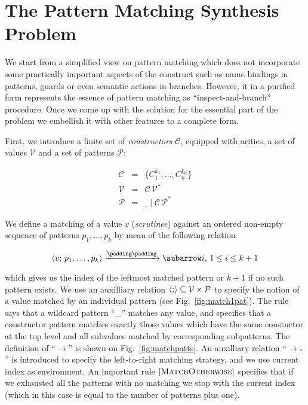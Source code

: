 \section{The Pattern Matching Synthesis Problem}

We start from a simplified view on pattern matching which does not incorporate some practically important aspects of the construct such as
name bindings in patterns, guards or even semantic actions in branches. However, it in a purified form represents the essence of pattern
matching as ``inspect-and-branch'' procedure. Once we come up with the solution for the essential part of the problem we embellish it with
other features to a complete form.

First, we introduce a finite set of \emph{constructors} $\mathcal C$, equipped with arities, a set of values $\mathcal{V}$
and a set of patterns $\mathcal{P}$:
 
\[
 \begin{array}{rcll}
    \mathcal{C} & = & \{ C_1^{k_1}, \dots, C_n^{k_n} \}\\
    \mathcal{V} & = & \mathcal{C}\,\mathcal{V}^*\\  
    \mathcal{P} & = & \_ \mid \mathcal{C}\,\mathcal{P}^*
 \end{array}
\]

We define a matching of a value $v$ (\emph{scrutinee}) against an ordered non-empty sequence of patterns $p_1,\dots,p_k$ by mean of the following
relation

\[
\setarrow{\xrightarrow}
\trans{\inbr{v;\,p_1,\dots,p_k}}{}{i},\,1\le i\le k+1
\]

which gives us the index of the leftmost matched pattern or $k+1$ if no such pattern exists. We use an auxilliary relation $\left<{;}\right>\subseteq\mathcal{V}\times\mathcal{P}$
to specify the notion of a value matched by an individual pattern (see Fig.~\ref{fig:match1pat}). The rule  says that
a wildcard pattern ``\_'' matches any value, and  specifies that a constructor pattern matches exactly those values which
have the same constuctor at the top level and all subvalues matched by corresponding subpatterns. The definition of ``$\xrightarrow{}{}$'' is
shown on Fig.~\ref{fig:matchpatts}. An auxilliary relation ``$\xrightarrow{}{}_*$'' is introduced to specify the left-to-right matching strategy, and we
use current index as environment. An important rule $\mbox{[\textsc{MatchOtherwise}]}$ specifies that if we exhausted all the patterns with no matching we stop with
the current index (which in this case is equal to the number of patterns plus one).

